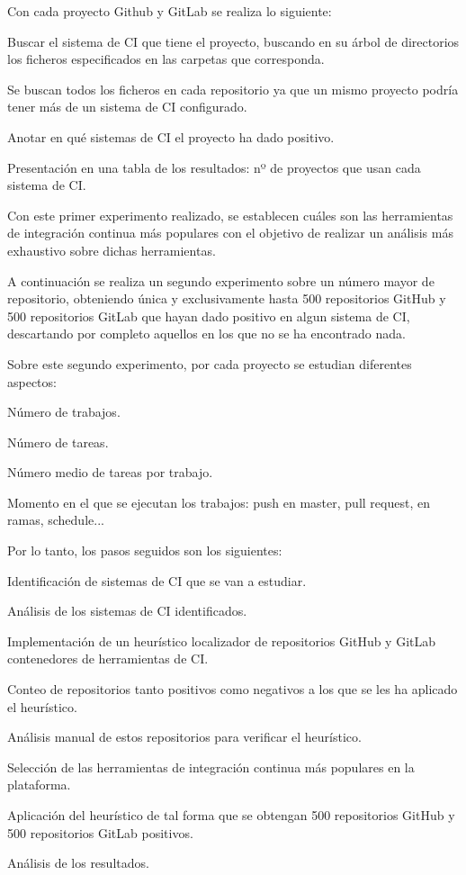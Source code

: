 Con cada proyecto Github y GitLab se realiza lo siguiente:
\begin{compactitem}
    \item Buscar el sistema de CI que tiene el proyecto, buscando en su árbol de directorios los ficheros especificados en las carpetas que corresponda.
    \item Se buscan todos los ficheros en cada repositorio ya que un mismo proyecto podría tener más de un sistema de CI configurado.
    \item Anotar en qué sistemas de CI el proyecto ha dado positivo.
    \item Presentación en una tabla de los resultados: nº de proyectos que usan cada sistema de CI.
\end{compactitem}
	
Con este primer experimento realizado, se establecen cuáles son las herramientas de integración continua más populares con el objetivo de realizar un análisis más exhaustivo sobre dichas herramientas.

A continuación se realiza un segundo experimento sobre un número mayor de repositorio, obteniendo única y exclusivamente hasta 500 repositorios GitHub y 500 repositorios GitLab que hayan dado positivo en algun sistema de CI, descartando por completo aquellos en los que no se ha encontrado nada.

Sobre este segundo experimento, por cada proyecto se estudian diferentes aspectos:
\begin{compactitem}
    \item Número de trabajos.
    \item Número de tareas.
    \item Número medio de tareas por trabajo.
    \item Momento en el que se ejecutan los trabajos: push en master, pull request, en ramas, schedule...
\end{compactitem}
	
Por lo tanto, los pasos seguidos son los siguientes:
\begin{compactitem}
    \item Identificación de sistemas de CI que se van a estudiar.
    \item Análisis de los sistemas de CI identificados.
    \item Implementación de un heurístico localizador de repositorios GitHub y GitLab contenedores de herramientas de CI.
    \item Conteo de repositorios tanto positivos como negativos a los que se les ha aplicado el heurístico.
    \item Análisis manual de estos repositorios para verificar el heurístico.
    \item Selección de las herramientas de integración continua más populares en la plataforma.
    \item Aplicación del heurístico de tal forma que se obtengan 500 repositorios GitHub y 500 repositorios GitLab positivos.
    \item Análisis de los resultados.
\end{compactitem}

